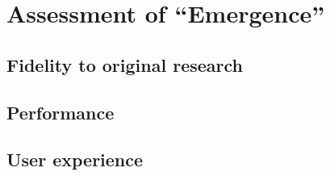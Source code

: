 \chapter{Assessment of ``Emergence''}

\section{Fidelity to original research}

\section{Performance}

\section{User experience}
